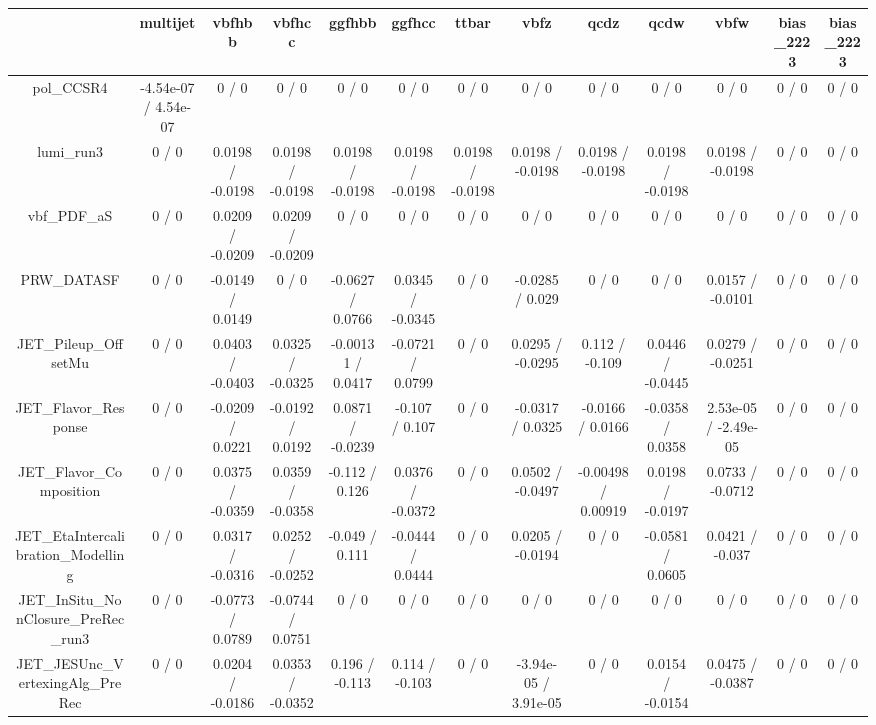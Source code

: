 \documentclass[10pt]{article}
\begin{document}
\begin{table}[htbp]
\begin{center}
\begin{tabular}{|c|c|c|c|c|c|c|c|c|c|c|c|c|}
\hline 
      & multijet      & vbfhbb      & vbfhcc      & ggfhbb      & ggfhcc      & ttbar      & vbfz      & qcdz      & qcdw      & vbfw      & bias_2223      & bias_2223 \\ 
\hline 
  pol_CCSR4 & -4.54e-07 / 4.54e-07 & 0 / 0 & 0 / 0 & 0 / 0 & 0 / 0 & 0 / 0 & 0 / 0 & 0 / 0 & 0 / 0 & 0 / 0 & 0 / 0 & 0 / 0 \\ 
  lumi_run3 & 0 / 0 & 0.0198 / -0.0198 & 0.0198 / -0.0198 & 0.0198 / -0.0198 & 0.0198 / -0.0198 & 0.0198 / -0.0198 & 0.0198 / -0.0198 & 0.0198 / -0.0198 & 0.0198 / -0.0198 & 0.0198 / -0.0198 & 0 / 0 & 0 / 0 \\ 
  vbf_PDF_aS & 0 / 0 & 0.0209 / -0.0209 & 0.0209 / -0.0209 & 0 / 0 & 0 / 0 & 0 / 0 & 0 / 0 & 0 / 0 & 0 / 0 & 0 / 0 & 0 / 0 & 0 / 0 \\ 
  PRW_DATASF & 0 / 0 & -0.0149 / 0.0149 & 0 / 0 & -0.0627 / 0.0766 & 0.0345 / -0.0345 & 0 / 0 & -0.0285 / 0.029 & 0 / 0 & 0 / 0 & 0.0157 / -0.0101 & 0 / 0 & 0 / 0 \\ 
  JET_Pileup_OffsetMu & 0 / 0 & 0.0403 / -0.0403 & 0.0325 / -0.0325 & -0.00131 / 0.0417 & -0.0721 / 0.0799 & 0 / 0 & 0.0295 / -0.0295 & 0.112 / -0.109 & 0.0446 / -0.0445 & 0.0279 / -0.0251 & 0 / 0 & 0 / 0 \\ 
  JET_Flavor_Response & 0 / 0 & -0.0209 / 0.0221 & -0.0192 / 0.0192 & 0.0871 / -0.0239 & -0.107 / 0.107 & 0 / 0 & -0.0317 / 0.0325 & -0.0166 / 0.0166 & -0.0358 / 0.0358 & 2.53e-05 / -2.49e-05 & 0 / 0 & 0 / 0 \\ 
  JET_Flavor_Composition & 0 / 0 & 0.0375 / -0.0359 & 0.0359 / -0.0358 & -0.112 / 0.126 & 0.0376 / -0.0372 & 0 / 0 & 0.0502 / -0.0497 & -0.00498 / 0.00919 & 0.0198 / -0.0197 & 0.0733 / -0.0712 & 0 / 0 & 0 / 0 \\ 
  JET_EtaIntercalibration_Modelling & 0 / 0 & 0.0317 / -0.0316 & 0.0252 / -0.0252 & -0.049 / 0.111 & -0.0444 / 0.0444 & 0 / 0 & 0.0205 / -0.0194 & 0 / 0 & -0.0581 / 0.0605 & 0.0421 / -0.037 & 0 / 0 & 0 / 0 \\ 
  JET_InSitu_NonClosure_PreRec_run3 & 0 / 0 & -0.0773 / 0.0789 & -0.0744 / 0.0751 & 0 / 0 & 0 / 0 & 0 / 0 & 0 / 0 & 0 / 0 & 0 / 0 & 0 / 0 & 0 / 0 & 0 / 0 \\ 
  JET_JESUnc_VertexingAlg_PreRec & 0 / 0 & 0.0204 / -0.0186 & 0.0353 / -0.0352 & 0.196 / -0.113 & 0.114 / -0.103 & 0 / 0 & -3.94e-05 / 3.91e-05 & 0 / 0 & 0.0154 / -0.0154 & 0.0475 / -0.0387 & 0 / 0 & 0 / 0 \\ 

\end{tabular}
\end{center}
\end{table}
\end{document}
